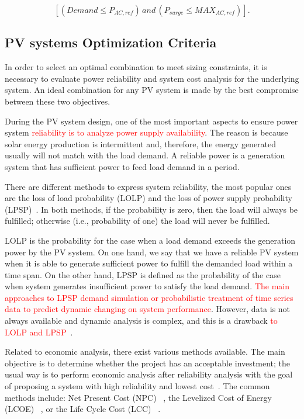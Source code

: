 \documentclass[review]{elsarticle}
\begin{document}
\begin{equation}
\label{eq:invcheck} 
\left[ (Demand \leq P_{AC,ref}) \, and \, (P_{surge} \leq MAX_{AC,ref}) \right].
\end{equation}

\subsection{PV systems Optimization Criteria}
In order to select an optimal combination to meet sizing constraints, it is necessary to evaluate power reliability and system cost analysis for the underlying system. An ideal combination for any PV system is made by the best compromise between these two objectives.

During the PV system design, one of the most important aspects to ensure power system \textcolor{red}{reliability is to analyze power supply availability}. The reason is because solar energy production is intermittent and, therefore, the energy generated usually will not match with the load demand. A reliable power is a generation system that has sufficient power to feed load demand in a period. 

There are different methods to express system reliability, the most popular ones are the loss of load probability (LOLP) and the loss of power supply probability (LPSP)~\cite{Alsadi2018}. In both methods, if the probability is zero, then the load will always be fulfilled; otherwise (i.e., probability of one) the load will never be fulfilled.

LOLP is the probability for the case when a load demand exceeds the generation power by the PV system. On one hand, we say that we have a reliable PV system when it is able to generate sufficient power to fulfill the demanded load within a time span. On the other hand, LPSP is defined as the probability of the case when system generates insufficient power to satisfy the load demand. \textcolor{red}{The main approaches to LPSP demand simulation or probabilistic treatment of time series data to predict dynamic changing on system performance}. However, data is not always available and dynamic analysis is complex, and this is a drawback \textcolor{red}{to LOLP and LPSP~\cite{Alsadi2018}}.

Related to economic analysis, there exist various methods available. The main objective is to determine whether the project has an acceptable investment; the usual way is to perform economic analysis after reliability analysis with the goal of proposing a system with high reliability and lowest cost~\cite{Alsadi2018}. The common methods include: Net Present Cost (NPC) \textcolor{red}{~\cite{Park2004}}, the Levelized Cost of Energy (LCOE) \textcolor{red}{~\cite{Zhou2010}}, or the Life Cycle Cost (LCC) \textcolor{red}{~\cite{Applasamy2011}}.
\end{document}
